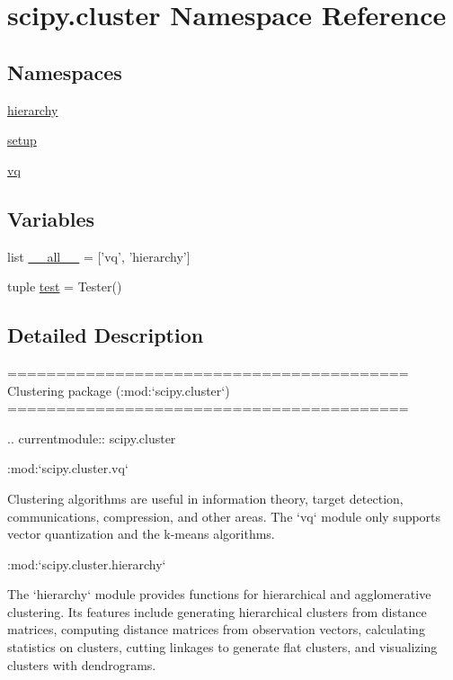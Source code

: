 \hypertarget{namespacescipy_1_1cluster}{}\section{scipy.\+cluster Namespace Reference}
\label{namespacescipy_1_1cluster}
\subsection*{Namespaces}
\begin{DoxyCompactItemize}
\item 
 \hyperlink{namespacescipy_1_1cluster_1_1hierarchy}{hierarchy}
\item 
 \hyperlink{namespacescipy_1_1cluster_1_1setup}{setup}
\item 
 \hyperlink{namespacescipy_1_1cluster_1_1vq}{vq}
\end{DoxyCompactItemize}
\subsection*{Variables}
\begin{DoxyCompactItemize}
\item 
list \hyperlink{namespacescipy_1_1cluster_a7dfac980b82e8960ad76243be426fa34}{\+\_\+\+\_\+all\+\_\+\+\_\+} = \mbox{[}'vq', 'hierarchy'\mbox{]}
\item 
tuple \hyperlink{namespacescipy_1_1cluster_acac402aafa03aff490caf26fab80aab4}{test} = Tester()
\end{DoxyCompactItemize}


\subsection{Detailed Description}
\begin{DoxyVerb}=========================================
Clustering package (:mod:`scipy.cluster`)
=========================================

.. currentmodule:: scipy.cluster

:mod:`scipy.cluster.vq`

Clustering algorithms are useful in information theory, target detection,
communications, compression, and other areas.  The `vq` module only
supports vector quantization and the k-means algorithms.

:mod:`scipy.cluster.hierarchy`

The `hierarchy` module provides functions for hierarchical and
agglomerative clustering.  Its features include generating hierarchical
clusters from distance matrices, computing distance matrices from
observation vectors, calculating statistics on clusters, cutting linkages
to generate flat clusters, and visualizing clusters with dendrograms.\end{DoxyVerb}
 

